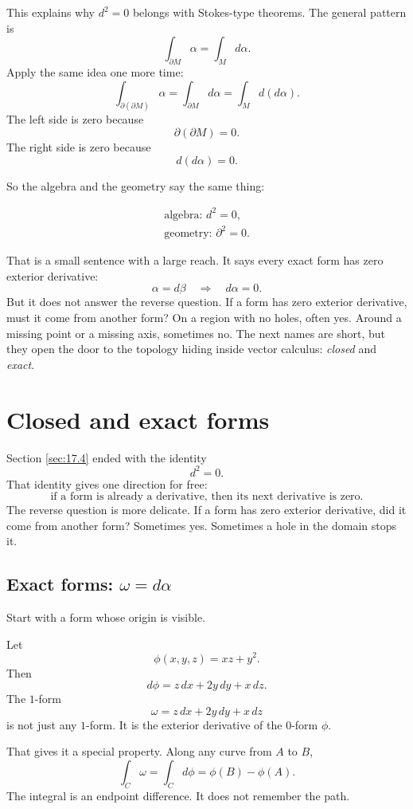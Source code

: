 This explains why \(d^2=0\) belongs with Stokes-type theorems.  The general pattern is
\[
    \int_{\partial M}\alpha=\int_M d\alpha.
\]
Apply the same idea one more time:
\[
    \int_{\partial(\partial M)}\alpha
    =
    \int_{\partial M}d\alpha
    =
    \int_M d(d\alpha).
\]
The left side is zero because
\[
    \partial(\partial M)=0.
\]
The right side is zero because
\[
    d(d\alpha)=0.
\]

So the algebra and the geometry say the same thing:

\[
\boxed{
\begin{array}{c}
\text{algebra: } d^2=0,\\[1mm]
\text{geometry: } \partial^2=0.
\end{array}
}
\]

That is a small sentence with a large reach.  It says every exact form has zero exterior
derivative:
\[
    \alpha=d\beta
    \quad\Longrightarrow\quad
    d\alpha=0.
\]
But it does not answer the reverse question.  If a form has zero exterior derivative,
must it come from another form?  On a region with no holes, often yes.  Around a
missing point or a missing axis, sometimes no.  The next names are short, but they
open the door to the topology hiding inside vector calculus: \emph{closed} and
\emph{exact}.
\section{Closed and exact forms}
\label{sec:17.5}

Section \ref{sec:17.4} ended with the identity
\[
    d^2=0.
\]
That identity gives one direction for free:
\[
    \text{if a form is already a derivative, then its next derivative is zero.}
\]
The reverse question is more delicate.  If a form has zero exterior derivative, did it
come from another form?  Sometimes yes.  Sometimes a hole in the domain stops it.

\subsection{Exact forms: \texorpdfstring{\(\omega=d\alpha\)}{omega = d alpha}}

Start with a form whose origin is visible.

Let
\[
    \phi(x,y,z)=xz+y^2.
\]
Then
\[
    d\phi=z\,dx+2y\,dy+x\,dz.
\]
The \(1\)-form
\[
    \omega=z\,dx+2y\,dy+x\,dz
\]
is not just any \(1\)-form.  It is the exterior derivative of the \(0\)-form \(\phi\).

That gives it a special property.  Along any curve from \(A\) to \(B\),
\[
    \int_C \omega
    =
    \int_C d\phi
    =
    \phi(B)-\phi(A).
\]
The integral is an endpoint difference.  It does not remember the path.

